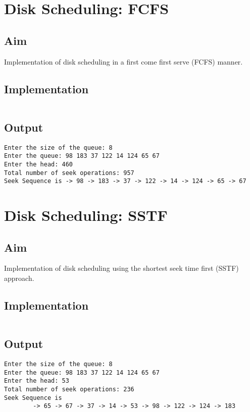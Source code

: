 \section{Disk Scheduling: FCFS}
\label{sec:disk-fcfs}

\subsection{Aim}
Implementation of disk scheduling in a
first come first serve (FCFS) manner.

\subsection{Implementation}

\inputminted[fontsize=\footnotesize,autogobble]{c}{code/disk_fcfs.c}

\pagebreak
\subsection{Output}
\begin{lstlisting}[style=output]
Enter the size of the queue: 8
Enter the queue: 98 183 37 122 14 124 65 67
Enter the head: 460
Total number of seek operations: 957
Seek Sequence is -> 98 -> 183 -> 37 -> 122 -> 14 -> 124 -> 65 -> 67
\end{lstlisting}


\pagebreak
\section{Disk Scheduling: SSTF}
\label{sec:disk-sstf}

\subsection{Aim}
Implementation of disk scheduling using the
shortest seek time first (SSTF) approach.

\subsection{Implementation}

\inputminted[fontsize=\footnotesize,autogobble]{c}{code/disk_sstf.c}

\subsection{Output}
\begin{lstlisting}[style=output]
Enter the size of the queue: 8
Enter the queue: 98 183 37 122 14 124 65 67
Enter the head: 53
Total number of seek operations: 236
Seek Sequence is 
        -> 65 -> 67 -> 37 -> 14 -> 53 -> 98 -> 122 -> 124 -> 183
\end{lstlisting}
